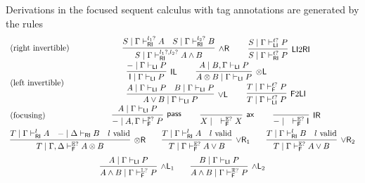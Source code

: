 \documentclass[submission,copyright,creativecommons]{eptcs}
\theoremstyle{definition}
\newcommand{\tl}{\otimes \mathsf{L}}
\newcommand{\tr}{\otimes \mathsf{R}}
\newcommand{\pass}{\mathsf{pass}}
\newcommand{\unitl}{\mathsf{IL}}
\newcommand{\unitr}{\mathsf{IR}}
\newcommand{\andlone}{\land \mathsf{L}_{1}}
\newcommand{\andltwo}{\land \mathsf{L}_{2}}
\newcommand{\andr}{\land \mathsf{R}}
\newcommand{\orl}{\lor \mathsf{L}}
\newcommand{\orrone}{\lor \mathsf{R}_{1}}
\newcommand{\orrtwo}{\lor \mathsf{R}_{2}}
\newcommand{\ax}{\mathsf{ax}}
\newcommand{\ot}{\otimes}
\newcommand{\I}{\mathsf{I}}
\newcommand{\RI}{\mathsf{RI}}
\newcommand{\LI}{\mathsf{LI}}
\newcommand{\F}{\mathsf{F}}
\newcommand{\tP}{\mathbb{P}}
\newcommand{\tL}{\mathbb{L}}
\newcommand{\tR}{\mathbb{R}}
\newcommand{\tE}{\mathbb{E}}
\newcommand{\proofbox}[1]{\begin{tabular}{l} #1 \end{tabular}}
\begin{document}
Derivations in the focused sequent calculus with tag annotations are generated by the rules
\begin{equation}\label{eq:focus}
  \begin{array}{lc}
    \text{(right invertible)} & %
    \proofbox{
      \infer[\andr]{S \mid \Gamma \vdash^{l_1?, l_2?}_{\RI} A \land B}{
        S \mid \Gamma \vdash^{l_1?}_{\RI} A
        &
        S \mid \Gamma \vdash^{l_2?}_{\RI} B
      }
    \qquad
    \infer[\LI 2 \RI]{S \mid \Gamma \vdash^{t?}_{\RI} P}{S \mid \Gamma \vdash^{t?}_{\LI} P}
    }
    \\[10pt]
    \text{(left invertible)} & %
    \proofbox{
      \infer[\unitl]{\I \mid \Gamma \vdash_{\LI} P}{{-} \mid \Gamma \vdash_{\LI} P}
    \qquad
    \infer[\tl]{A \ot B \mid \Gamma \vdash_{\LI} P}{A \mid B , \Gamma \vdash_{\LI} P}
    \\
    \infer[\orl]{A \lor B \mid \Gamma \vdash_\LI P}{
      A \mid \Gamma \vdash_\LI P
      &
      B \mid \Gamma \vdash_\LI P
    }
    \qquad
    \infer[\F 2 \LI]{T \mid \Gamma \vdash^{t?}_{\LI} P}{T \mid \Gamma \vdash^{t?}_{\F} P}
    }
    \\[10pt]
    \text{(focusing)} &    %
    \proofbox{
    \infer[\pass]{{-} \mid A , \Gamma \vdash^{\tP?}_{\F} P }{
        A \mid \Gamma \vdash_{\LI} P
    }
    \qquad
    \infer[\ax]{X \mid \quad \vdash^{\tE?}_{\F} X}{}
    \qquad
    \infer[\unitr]{{-} \mid \quad \vdash^{\tE?}_{\F} \I}{}
    }
    \\[10pt]
    \multicolumn{2}{c}{
    \infer[\tr]{T \mid \Gamma , \Delta \vdash^{\tE?}_{\F} A \ot B}{
      T \mid \Gamma \vdash^{l}_{\RI} A
      &
      {-} \mid \Delta \vdash_{\RI} B
      &
      l \ \text{valid}
    }
    \qquad
    \infer[\orrone]{T \mid \Gamma \vdash^{\tE?}_{\F} A \lor B}{
      T \mid \Gamma \vdash^{l}_{\RI} A
      &
      l \ \text{valid}
    }
    \qquad
    \infer[\orrtwo]{T \mid \Gamma \vdash^{\tE?}_{\F} A \lor B}{
      T \mid \Gamma \vdash^{l}_{\RI} B
      &
      l \ \text{valid}
    }
    }
    \\[6pt]
    \multicolumn{2}{c}{
    \infer[\andlone]{A \land B \mid \Gamma \vdash^{\tL?}_{\F} P}{A \mid \Gamma \vdash_{\LI} P}
    \qquad
    \infer[\andltwo]{A \land B \mid \Gamma \vdash^{\tR?}_{\F} P}{B \mid \Gamma \vdash_{\LI} P}
    }
  \end{array}
\end{equation}
\end{document}
